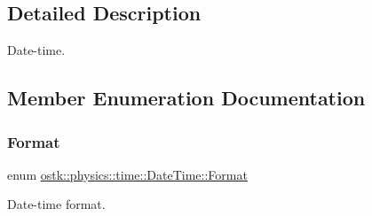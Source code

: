 \subsection{Detailed Description}
Date-\/time. 

\subsection{Member Enumeration Documentation}
\mbox{\label{classostk_1_1physics_1_1time_1_1_date_time_a1d21d982b18bf56ed684fcf1cd97e092}} 
\subsubsection{\texorpdfstring{Format}{Format}}
{\footnotesize\ttfamily enum \hyperlink{classostk_1_1physics_1_1time_1_1_date_time_a1d21d982b18bf56ed684fcf1cd97e092}{ostk\+::physics\+::time\+::\+Date\+Time\+::\+Format}\hspace{0.3cm}{\ttfamily [strong]}}



Date-\/time format. 

